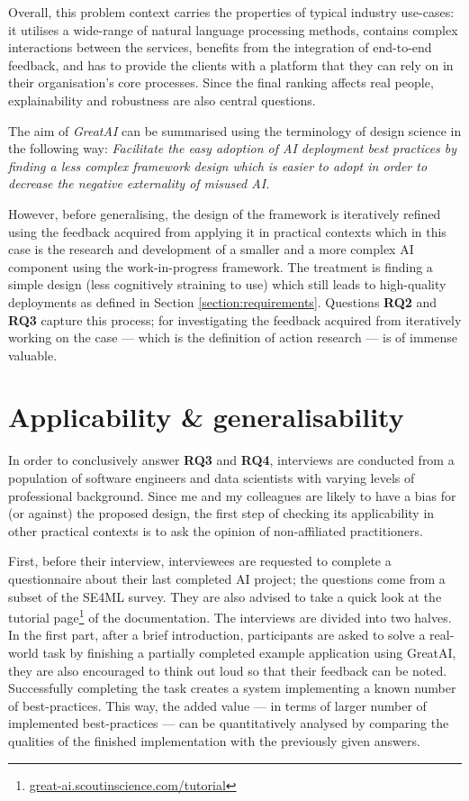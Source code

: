 Overall, this problem context carries the properties of typical industry use-cases: it utilises a wide-range of natural language processing methods, contains complex interactions between the services, benefits from the integration of end-to-end feedback, and has to provide the clients with a platform that they can rely on in their organisation's core processes. Since the final ranking affects real people, explainability and robustness are also central questions.

The aim of \textit{GreatAI} can be summarised using the terminology of design science in the following way: 
\textit{Facilitate the easy adoption of AI deployment best practices
by finding a less complex framework design 
which is easier to adopt
in order to decrease the negative externality of misused AI.}

However, before generalising, the design of the framework is iteratively refined using the feedback acquired from applying it in practical contexts which in this case is the research and development of a smaller and a more complex AI component using the work-in-progress framework. The treatment is finding a simple design (less cognitively straining to use) which still leads to high-quality deployments as defined in Section \ref{section:requirements}. Questions \textbf{RQ2} and \textbf{RQ3} capture this process; for investigating the feedback acquired from iteratively working on the case --- which is the definition of action research --- is of immense valuable. 

\section{Applicability \& generalisability}

In order to conclusively answer \textbf{RQ3} and \textbf{RQ4}, interviews are conducted from a population of software engineers and data scientists with varying levels of professional background. Since me and my colleagues are likely to have a bias for (or against) the proposed design, the first step of checking its applicability in other practical contexts is to ask the opinion of non-affiliated practitioners.

First, before their interview, interviewees are requested to complete a questionnaire about their last completed AI project; the questions come from a subset of the SE4ML survey. They are also advised to take a quick look at the tutorial page\footnote{\href{https://great-ai.scoutinscience.com/tutorial/}{great-ai.scoutinscience.com/tutorial}} of the documentation. The interviews are divided into two halves. In the first part, after a brief introduction, participants are asked to solve a real-world task by finishing a partially completed example application using GreatAI, they are also encouraged to think out loud so that their feedback can be noted. Successfully completing the task creates a system implementing a known number of best-practices. This way, the added value --- in terms of larger number of implemented best-practices --- can be quantitatively analysed by comparing the qualities of the finished implementation with the previously given answers. 


